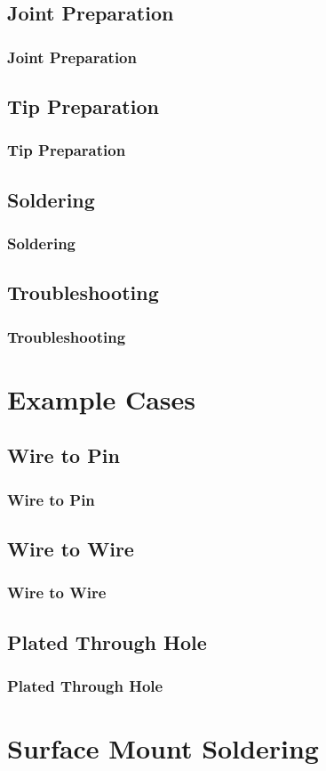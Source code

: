 \documentclass{beamer}
\begin{document}
\subsection{Joint Preparation}
\begin{frame}[t]
	\frametitle{Joint Preparation}
\end{frame}

\subsection{Tip Preparation}
\begin{frame}[t]
	\frametitle{Tip Preparation}
\end{frame}

\subsection{Soldering}
\begin{frame}[t]
	\frametitle{Soldering}
\end{frame}

\subsection{Troubleshooting}
\begin{frame}[t]
	\frametitle{Troubleshooting}
\end{frame}

\section{Example Cases}
\subsection{Wire to Pin}
\begin{frame}[t]
	\frametitle{Wire to Pin}
\end{frame}

\subsection{Wire to Wire}
\begin{frame}[t]
	\frametitle{Wire to Wire}
\end{frame}

\subsection{Plated Through Hole}
\begin{frame}[t]
	\frametitle{Plated Through Hole}
\end{frame}

\section{Surface Mount Soldering}
\end{document}
